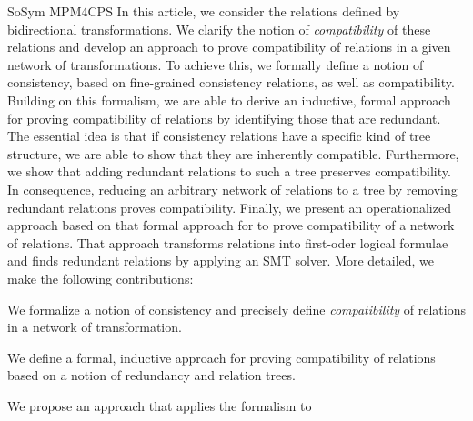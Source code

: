 \begin{copiedFrom}{SoSym MPM4CPS}
In this article, we consider the relations defined by bidirectional transformations.
We clarify the notion of \emph{compatibility} of these relations and develop an approach to prove compatibility of relations in a given network of transformations.
To achieve this, we formally define a notion of consistency, based on fine-grained consistency relations, as well as compatibility.
Building on this formalism, we are able to derive an inductive, formal approach for proving compatibility of relations by identifying those that are redundant.
The essential idea is that if consistency relations have a specific kind of tree structure, we are able to show that they are inherently compatible.
Furthermore, we show that adding redundant relations to such a tree preserves compatibility.
In consequence, reducing an arbitrary network of relations to a tree by removing redundant relations proves compatibility.
Finally, we present an operationalized approach based on that formal approach for \qvtr to prove compatibility of a network of \qvtr relations.
That approach transforms \qvtr relations into first-oder logical formulae and finds redundant relations by applying an SMT solver.
More detailed, we make the following contributions:
\begin{description}[leftmargin=\parindent]
    \item[\contributionlabel{contrib:formalization}{Compatibility Formalization}{C1}:] We formalize a notion of consistency and precisely define \emph{compatibility} of relations in a network of transformation.
    \item[\contributionlabel{contrib:formalapproach}{Formal Approach}{C2}:] We define a formal, inductive approach for proving compatibility of relations based on a notion of redundancy and relation trees. %
    \item[\contributionlabel{contrib:operationalizedapproach}{Operationalized Approach}{C3}:] We propose an approach that applies the formalism to %

\end{description}
\end{copiedFrom}
